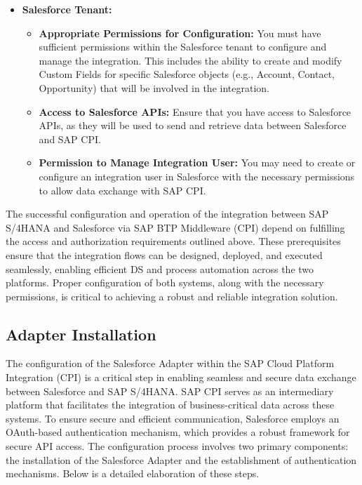 \begin{itemize}
\begin{figure}[H]
    \end{figure}

    \item \textbf{Salesforce Tenant:}
    \begin{itemize}
        \item \textbf{Appropriate Permissions for Configuration:} You must have sufficient permissions within the Salesforce tenant to configure and manage the integration. This includes the ability to create and modify Custom Fields for specific Salesforce objects (e.g., Account, Contact, Opportunity) that will be involved in the integration.
        \item \textbf{Access to Salesforce APIs:} Ensure that you have access to Salesforce APIs, as they will be used to send and retrieve data between Salesforce and SAP CPI.
        \item \textbf{Permission to Manage Integration User:} You may need to create or configure an integration user in Salesforce with the necessary permissions to allow data exchange with SAP CPI.
    \end{itemize}
\end{itemize}


The successful configuration and operation of the integration between SAP S/4HANA and Salesforce via SAP BTP Middleware (CPI) depend on fulfilling the access and authorization requirements outlined above. These prerequisites ensure that the integration flows can be designed, deployed, and executed seamlessly, enabling efficient DS and process automation across the two platforms. Proper configuration of both systems, along with the necessary permissions, is critical to achieving a robust and reliable integration solution.

\subsection{Adapter Installation }
The configuration of the Salesforce Adapter within the SAP Cloud Platform Integration (CPI) is a critical step in enabling seamless and secure data exchange between Salesforce and SAP S/4HANA. SAP CPI serves as an intermediary platform that facilitates the integration of business-critical data across these systems. To ensure secure and efficient communication, Salesforce employs an OAuth-based authentication mechanism, which provides a robust framework for secure API access. The configuration process involves two primary components: the installation of the Salesforce Adapter and the establishment of authentication mechanisms. Below is a detailed elaboration of these steps.

